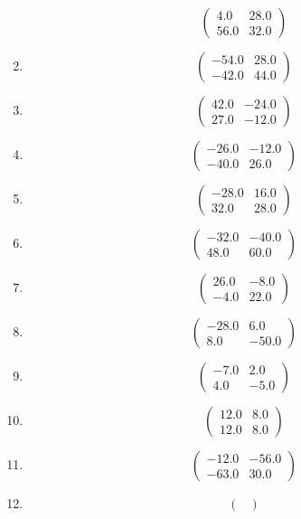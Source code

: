 \documentclass{article}%
\begin{document}
\begin{enumerate}[label=\arabic*)]
\[%
\begin{pmatrix}%
4.0&28.0\\%
56.0&32.0%
\end{pmatrix}%
\]%
\item%
\[%
\begin{pmatrix}%
-54.0&28.0\\%
-42.0&44.0%
\end{pmatrix}%
\]%
\item%
\[%
\begin{pmatrix}%
42.0&-24.0\\%
27.0&-12.0%
\end{pmatrix}%
\]%
\item%
\[%
\begin{pmatrix}%
-26.0&-12.0\\%
-40.0&26.0%
\end{pmatrix}%
\]%
\item%
\[%
\begin{pmatrix}%
-28.0&16.0\\%
32.0&28.0%
\end{pmatrix}%
\]%
\item%
\[%
\begin{pmatrix}%
-32.0&-40.0\\%
48.0&60.0%
\end{pmatrix}%
\]%
\item%
\[%
\begin{pmatrix}%
26.0&-8.0\\%
-4.0&22.0%
\end{pmatrix}%
\]%
\item%
\[%
\begin{pmatrix}%
-28.0&6.0\\%
8.0&-50.0%
\end{pmatrix}%
\]%
\item%
\[%
\begin{pmatrix}%
-7.0&2.0\\%
4.0&-5.0%
\end{pmatrix}%
\]%
\item%
\[%
\begin{pmatrix}%
12.0&8.0\\%
12.0&8.0%
\end{pmatrix}%
\]%
\item%
\[%
\begin{pmatrix}%
-12.0&-56.0\\%
-63.0&30.0%
\end{pmatrix}%
\]%
\item%
\[%
\begin{pmatrix}%

\end{pmatrix}\]
\end{enumerate}
\end{document}

